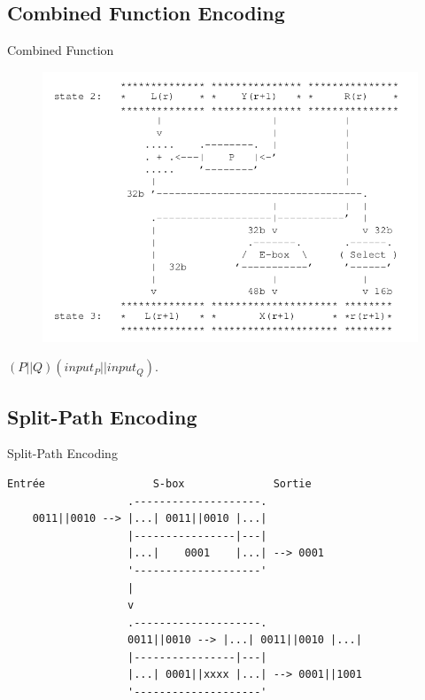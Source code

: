 \documentclass{beamer}
\begin{document}
\subsection{Combined Function Encoding}

\begin{frame}{Combined Function}
  \begin{figure}[h]
    \centering
    \includegraphics[scale=0.4]{./images/etape2.png}
  \end{figure}
  \begin{center}
    $(P||Q)(input_P||input_Q)$.
  \end{center}
\end{frame}

\subsection{Split-Path Encoding}

\begin{frame}[fragile]{Split-Path Encoding}
  \begin{Verbatim}[samepage=true]
    Entrée                 S-box              Sortie
                   .--------------------.
    0011||0010 --> |...| 0011||0010 |...|
                   |----------------|---|
                   |...|    0001    |...| --> 0001
                   '--------------------'
                   | 
                   v
                   .--------------------.
                   0011||0010 --> |...| 0011||0010 |...|
                   |----------------|---|
                   |...| 0001||xxxx |...| --> 0001||1001
                   '--------------------'
  \end{Verbatim}
  
\end{frame}
\end{document}
